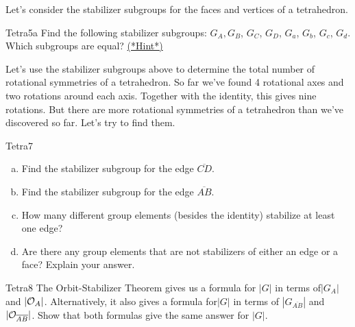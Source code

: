 Let's consider the stabilizer subgroups for the faces and vertices of a tetrahedron. 

\begin{exercise}{Tetra5a}
Find the following stabilizer subgroups:
$G_{A},  G_{B}$, $G_{C}$, $G_{D}$, $G_{a}$, $G_{b}$, $G_{c}$, $G_{d}$. Which subgroups are equal?
\hyperref[sec:GroupActions:Hints]{(*Hint*)}
\end{exercise}

Let's use the stabilizer subgroups above to determine the total number of rotational symmetries of a tetrahedron.  
So far we've found 4 rotational axes and two rotations around each axis. Together with the identity, this gives nine rotations. But there are more rotational symmetries of a tetrahedron than we've discovered so far.  Let's try to find them. 

\begin{exercise}{Tetra7}
\begin{enumerate}[(a)]
\item Find the stabilizer subgroup for the edge $\overline{CD}$. 
\item Find the stabilizer subgroup for the edge $\overline{AB}$.
\item How many different group elements (besides the identity) stabilize at least one edge?
\item Are there any group elements that are not stabilizers of either an edge or a face?  Explain your answer.
\end{enumerate}
\end{exercise}	

\begin{exercise}{Tetra8}
The Orbit-Stabilizer Theorem gives us a formula for $|G|$ in terms of$| G_{A}|$ and $|{\cal O}_{A}|$. Alternatively, it also gives a formula for$|G|$ in terms of  $| G_{\overline{AB}}|$ and $|{\cal O}_{\overline{AB}}|$. Show that both formulas give the same answer for $|G|$.
\end{exercise}

